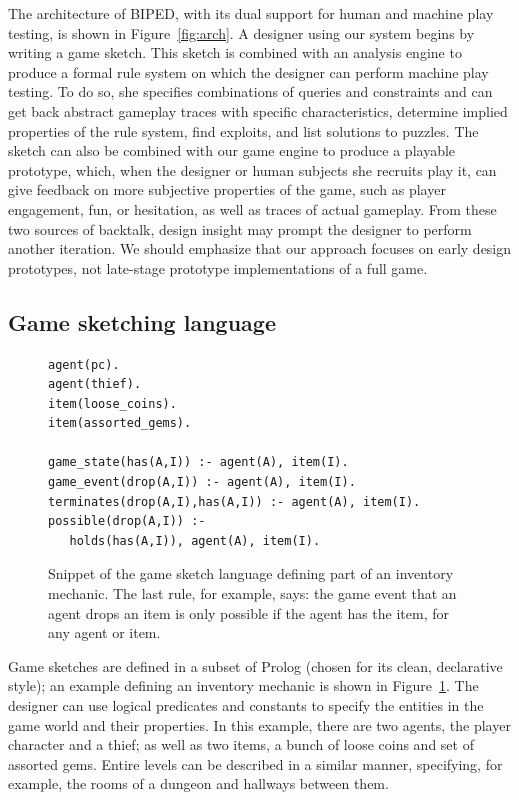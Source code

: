 \documentclass[letterpaper]{article}
\begin{document}
The architecture of BIPED, with its dual support for human and machine play
testing, is shown in Figure~\ref{fig:arch}. A designer using our system begins
by writing a game sketch. This sketch is combined with an analysis engine to
produce a formal rule system on which the designer can perform machine play
testing. To do so, she specifies combinations of queries and constraints and
can get back abstract gameplay traces with specific characteristics, determine
implied properties of the rule system, find exploits, and list solutions to
puzzles.  The sketch can also be combined with our game engine to produce a
playable prototype, which, when the designer or human subjects she recruits
play it, can give feedback on more subjective properties of the game, such as
player engagement, fun, or hesitation, as well as traces of actual gameplay.
From these two sources of backtalk, design insight may prompt the designer to
perform another iteration.  We should emphasize that our approach focuses on
early design prototypes, not late-stage prototype implementations of a full
game.

\subsection{Game sketching language}

\begin{figure}
\begin{Verbatim}[frame=single,fontsize=\scriptsize]
agent(pc).
agent(thief).
item(loose_coins).
item(assorted_gems).

game_state(has(A,I)) :- agent(A), item(I).
game_event(drop(A,I)) :- agent(A), item(I).
terminates(drop(A,I),has(A,I)) :- agent(A), item(I).
possible(drop(A,I)) :-
   holds(has(A,I)), agent(A), item(I).
\end{Verbatim}
\caption{Snippet of the game sketch language defining part of an inventory mechanic. The last rule,
for example, says: the game event that an agent drops an item is only possible if the agent has the item, for
any agent or item.}
\label{fig:lang}
\end{figure}

Game sketches are defined in a subset of Prolog (chosen for its clean,
declarative style); an example defining an inventory mechanic is shown in
Figure~\ref{fig:lang}. The designer can use logical predicates and constants to
specify the entities in the game world and their properties. In this example,
there are two agents, the player character and a thief; as well as two items, a bunch
of loose coins and set of assorted gems. Entire levels can be described in a
similar manner, specifying, for example, the rooms of a dungeon and hallways
between them.
\end{document}
